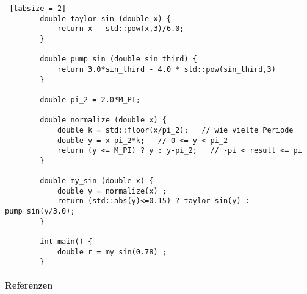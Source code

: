\documentclass{article}
\begin{document}
	 	\begin{lstlisting} [tabsize = 2]
	 	double taylor_sin (double x) {
		 	return x - std::pow(x,3)/6.0;
	 	}
	 	
	 	double pump_sin (double sin_third) {
		 	return 3.0*sin_third - 4.0 * std::pow(sin_third,3)
	 	}
	 	
	 	double pi_2 = 2.0*M_PI;
	 	
	 	double normalize (double x) {
		 	double k = std::floor(x/pi_2);   // wie vielte Periode
		 	double y = x-pi_2*k;   // 0 <= y < pi_2
		 	return (y <= M_PI) ? y : y-pi_2;   // -pi < result <= pi
	 	}
	 	
	 	double my_sin (double x) {
		 	double y = normalize(x) ;
		 	return (std::abs(y)<=0.15) ? taylor_sin(y) : pump_sin(y/3.0);
	 	}
	 	
	 	int main() {
		 	double r = my_sin(0.78) ;
	 	}
	 	\end{lstlisting}
	 	
	 	
	 	

	 	
	 	
	 	
	 	
	 	
	 	
	 	
	 	
	 	\paragraph{Referenzen}
	 	
\end{document}
